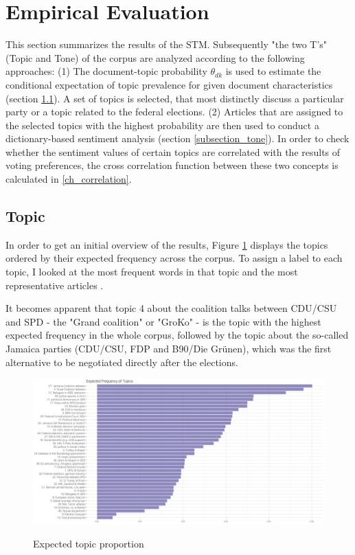 \documentclass[12pt,a4paper,notitlepage]{article}
\begin{document}
\section{Empirical Evaluation}\label{ch_empirical}

This section summarizes the results of the STM. Subsequently "the two T's" (Topic and Tone) of the corpus are analyzed according to the following approaches: (1) The document-topic probability $\theta_{dk}$ is used to estimate the conditional expectation of topic prevalence for given document characteristics (section \ref{subsection_topic}). A set of topics is selected, that most distinctly discuss a particular party or a topic related to the federal elections. (2) Articles that are assigned to the selected topics with the highest probability are then used to conduct a dictionary-based sentiment analysis (section \ref{subsection_tone}). In order to check whether the sentiment values of certain topics are correlated with the results of voting preferences, the cross correlation function between these two concepts is calculated in \ref{ch_correlation}.

\subsection{Topic}\label{subsection_topic}

In order to get an initial overview of the results, Figure \ref{fig_expected_freq} displays the topics ordered by their expected frequency across the corpus. To assign a label to each topic, I looked at the most frequent words in that topic and the most representative articles \citep{roberts_model_2016}. 

It becomes apparent that topic 4 about the coalition talks between CDU/CSU and SPD - the "Grand coalition" or "GroKo" - is the topic with the highest expected frequency in the whole corpus, followed by the topic about the so-called Jamaica parties (CDU/CSU, FDP and B90/Die Grünen), which was the first alternative to be negotiated directly after the elections.  

\begin{figure}[H]
	\begin{center}
	\caption{Expected topic proportion}
		\includegraphics[width=\textwidth,keepaspectratio]{../figs/expected_freq.png}
		\label{fig_expected_freq}
\end{center}
\end{figure}
\end{document}
